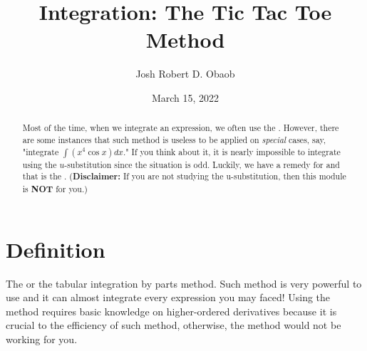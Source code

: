 \documentclass[11pt,paper=letter]{scrartcl}
\begin{document}
\title{Integration: The Tic Tac Toe Method}
\subtitle{}
\author{Josh Robert D. Obaob}
\date{March 15, 2022}

\maketitle




\begin{abstract}
Most of the time, when we integrate an expression, we often use the . However, there are some instances that such method is useless to be applied on \textit{special} cases, say, "integrate $\int \left(x^4 \cos{x}\right) dx$." If you think about it, it is nearly impossible to integrate using the $u$-substitution since the situation is odd. Luckily, we have a remedy for and that is the . (\textbf{Disclaimer:} If you are not studying the u-substitution, then this module is \textbf{NOT} for you.)
\end{abstract}

\section{Definition}

The  or the {tabular integration by parts method}. Such method is very powerful to use and it can almost integrate every expression you may faced! Using the method requires basic knowledge on higher-ordered derivatives because it is crucial to the efficiency of such method, otherwise, the method would not be working for you.
\end{document}

